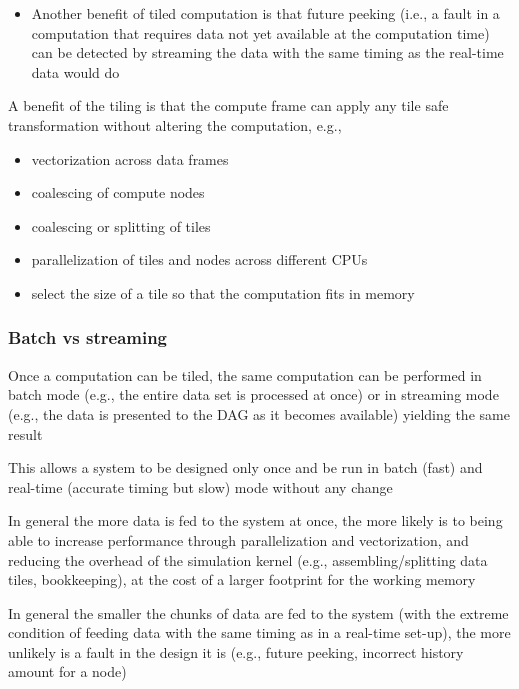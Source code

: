 \documentclass[11pt, reqno]{amsart}
\theoremstyle{definition}
\theoremstyle{remark}
\begin{document}
\begin{itemize}
  \item Another benefit of tiled computation is that future peeking (i.e., a
        fault in a computation that requires data not yet available at the
        computation time) can be detected by streaming the data with the same
        timing as the real-time data would do
\end{itemize}

A benefit of the tiling is that the compute frame can apply any tile
safe transformation without altering the computation, e.g.,

\begin{itemize}
  \item vectorization across data frames
  \item coalescing of compute nodes
  \item coalescing or splitting of tiles
  \item parallelization of tiles and nodes across different CPUs
  \item select the size of a tile so that the computation fits in memory
\end{itemize}

\subsubsection{Batch vs streaming}

Once a computation can be tiled, the same computation can be performed
in batch mode (e.g., the entire data set is processed at once) or in
streaming mode (e.g., the data is presented to the DAG as it becomes
available) yielding the same result

This allows a system to be designed only once and be run in batch (fast)
and real-time (accurate timing but slow) mode without any change

In general the more data is fed to the system at once, the more likely
is to being able to increase performance through parallelization and
vectorization, and reducing the overhead of the simulation kernel (e.g.,
assembling/splitting data tiles, bookkeeping), at the cost of a larger
footprint for the working memory

In general the smaller the chunks of data are fed to the system (with
the extreme condition of feeding data with the same timing as in a
real-time set-up), the more unlikely is a fault in the design it is
(e.g., future peeking, incorrect history amount for a node)
\end{document}
